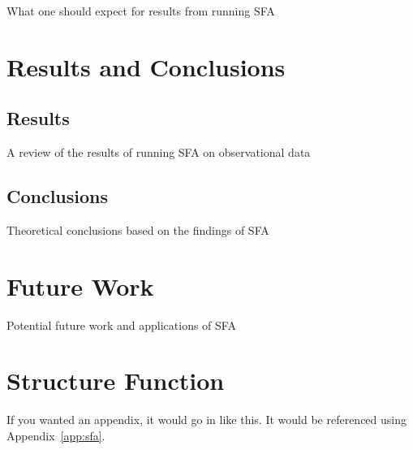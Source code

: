\documentclass[12pt, oneside]{smuthesis}
\begin{document}
What one should expect for results from running SFA

\chapter{\sc Results and Conclusions} \label{resultsConclusions}

\section{\sc Results} \label{results}

A review of the results of running SFA on observational data

\section{\sc Conclusions} \label{conclusions}

Theoretical conclusions based on the findings of SFA

\chapter{\sc Future Work} \label{futureWork}

Potential future work and applications of SFA


\appendix

\chapter{Structure Function} \label{appendixSFA}
\label{app:sfa}
If you wanted an appendix, it would go in like this.  It would be 
referenced using Appendix~\ref{app:sfa}.


\begin{singlespace}

\end{singlespace}
\end{document}
